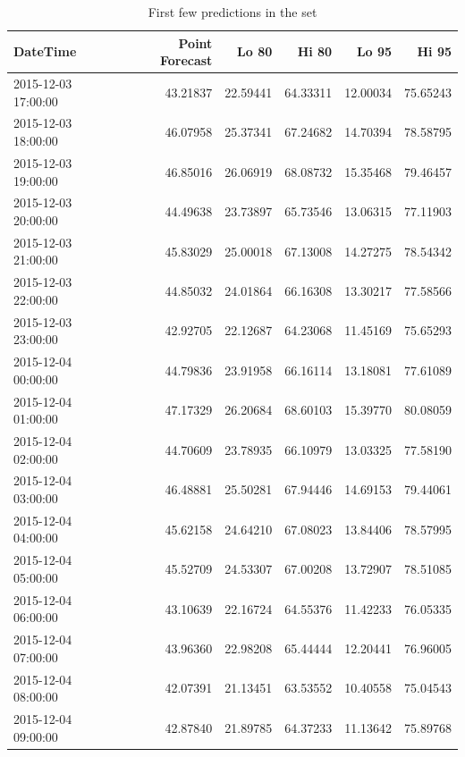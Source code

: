 \documentclass[openany]{book}
\begin{document}
\begin{table}[H]

\caption{\label{tab:unnamed-chunk-40}First few predictions in the set}
\centering
\begin{tabular}{l|r|r|r|r|r}
\hline
DateTime & Point Forecast & Lo 80 & Hi 80 & Lo 95 & Hi 95\\
\hline
\rowcolor{gray!6}  2015-12-03 17:00:00 & 43.21837 & 22.59441 & 64.33311 & 12.00034 & 75.65243\\
\hline
2015-12-03 18:00:00 & 46.07958 & 25.37341 & 67.24682 & 14.70394 & 78.58795\\
\hline
\rowcolor{gray!6}  2015-12-03 19:00:00 & 46.85016 & 26.06919 & 68.08732 & 15.35468 & 79.46457\\
\hline
2015-12-03 20:00:00 & 44.49638 & 23.73897 & 65.73546 & 13.06315 & 77.11903\\
\hline
\rowcolor{gray!6}  2015-12-03 21:00:00 & 45.83029 & 25.00018 & 67.13008 & 14.27275 & 78.54342\\
\hline
2015-12-03 22:00:00 & 44.85032 & 24.01864 & 66.16308 & 13.30217 & 77.58566\\
\hline
\rowcolor{gray!6}  2015-12-03 23:00:00 & 42.92705 & 22.12687 & 64.23068 & 11.45169 & 75.65293\\
\hline
2015-12-04 00:00:00 & 44.79836 & 23.91958 & 66.16114 & 13.18081 & 77.61089\\
\hline
\rowcolor{gray!6}  2015-12-04 01:00:00 & 47.17329 & 26.20684 & 68.60103 & 15.39770 & 80.08059\\
\hline
2015-12-04 02:00:00 & 44.70609 & 23.78935 & 66.10979 & 13.03325 & 77.58190\\
\hline
\rowcolor{gray!6}  2015-12-04 03:00:00 & 46.48881 & 25.50281 & 67.94446 & 14.69153 & 79.44061\\
\hline
2015-12-04 04:00:00 & 45.62158 & 24.64210 & 67.08023 & 13.84406 & 78.57995\\
\hline
\rowcolor{gray!6}  2015-12-04 05:00:00 & 45.52709 & 24.53307 & 67.00208 & 13.72907 & 78.51085\\
\hline
2015-12-04 06:00:00 & 43.10639 & 22.16724 & 64.55376 & 11.42233 & 76.05335\\
\hline
\rowcolor{gray!6}  2015-12-04 07:00:00 & 43.96360 & 22.98208 & 65.44444 & 12.20441 & 76.96005\\
\hline
2015-12-04 08:00:00 & 42.07391 & 21.13451 & 63.53552 & 10.40558 & 75.04543\\
\hline
\rowcolor{gray!6}  2015-12-04 09:00:00 & 42.87840 & 21.89785 & 64.37233 & 11.13642 & 75.89768\\

\end{tabular}
\end{table}
\end{document}
